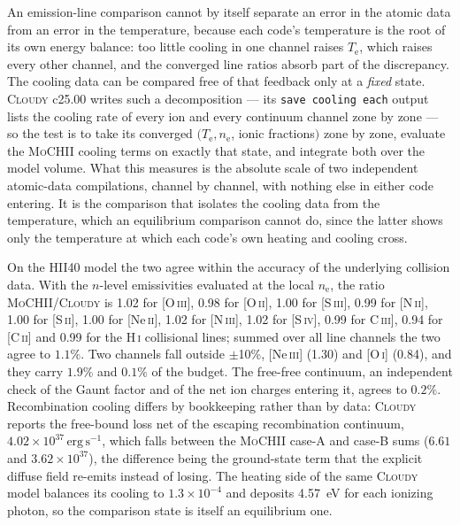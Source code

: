 \documentclass[twocolumn,linenumbers]{aastex702}
\newcommand{\code}[1]{\texttt{#1}}
\newcommand{\MoCHII}{\textsc{MoCHII}}
\newcommand{\HI}{H\,\textsc{i}}
\newcommand{\Te}{T_{\mathrm{e}}}
\newcommand{\nelec}{n_{\mathrm{e}}}
\begin{document}
An emission-line comparison cannot by itself separate an error in the
atomic data from an error in the temperature, because each code's
temperature is the root of its own energy balance: too little cooling in
one channel raises $\Te$, which raises every other channel, and the
converged line ratios absorb part of the discrepancy.  The cooling data can
be compared free of that feedback only at a \emph{fixed} state.
\textsc{Cloudy} c25.00 writes such a decomposition --- its
\code{save cooling each} output lists the cooling rate of every ion and
every continuum channel zone by zone --- so the test is to take its
converged $(\Te, \nelec$, ionic fractions$)$ zone by zone, evaluate the
\MoCHII{} cooling terms on exactly that state, and integrate both over the
model volume.  What this measures is the absolute scale of two independent
atomic-data compilations, channel by channel, with nothing else in either
code entering.  It is the comparison that isolates the cooling data from
the temperature, which an equilibrium comparison cannot do, since the
latter shows only the temperature at which each code's own heating and
cooling cross.

On the HII40 model the two agree within the accuracy of the underlying
collision data.  With the $n$-level emissivities evaluated at the local
$\nelec$, the ratio \MoCHII/\textsc{Cloudy} is 1.02 for [O\,\textsc{iii}],
0.98 for [O\,\textsc{ii}], 1.00 for [S\,\textsc{iii}], 0.99 for
[N\,\textsc{ii}], 1.00 for [S\,\textsc{ii}], 1.00 for [Ne\,\textsc{ii}],
1.02 for [N\,\textsc{iii}], 1.02 for [S\,\textsc{iv}], 0.99 for
C\,\textsc{iii}], 0.94 for [C\,\textsc{ii}] and 0.99 for the \HI{}
collisional lines; summed over all line channels the two agree to $1.1\%$.
Two channels fall outside $\pm$10\%, [Ne\,\textsc{iii}] (1.30) and
[O\,\textsc{i}] (0.84), and they carry $1.9\%$ and $0.1\%$ of the budget.
The free-free continuum, an independent
check of the Gaunt factor and of the net ion charges entering it, agrees to
$0.2\%$.  Recombination cooling differs by bookkeeping rather than by data:
\textsc{Cloudy} reports the free-bound loss net of the escaping
recombination continuum, $4.02\times10^{37}\,\mathrm{erg\,s^{-1}}$, which
falls between the \MoCHII{} case-A and case-B sums ($6.61$ and
$3.62\times10^{37}$), the difference being the ground-state term that the
explicit diffuse field re-emits instead of losing.  The heating side of the
same \textsc{Cloudy} model balances its cooling to $1.3\times10^{-4}$ and
deposits 4.57~eV for each ionizing photon, so the comparison state is
itself an equilibrium one.
\end{document}
